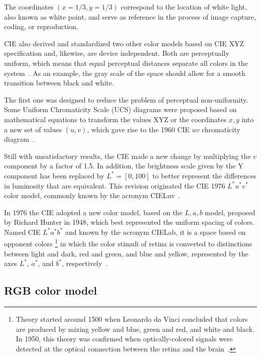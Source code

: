 The coordinates $ (x = 1/3, y = 1/3) $ correspond to the location of white light, also known as white point, and serve as reference in the process of image capture, coding, or reproduction.

CIE also derived and standardized two other color models based on CIE XYZ specification and, likewise, are device independent. Both are perceptually uniform, which means that equal perceptual distances separate all colors in the system~\citep{vezhnevets:03}. As an example, the gray scale of the space should allow for a smooth transition between black and white.

The first one was designed to reduce the problem of perceptual non-uniformity. Some Uniform Chromaticity Scale (UCS) diagrams were proposed based on mathematical equations to transform the values XYZ or the coordinates $x, y$ into a new set of values $(u, v)$, which gave rise to the 1960 CIE $uv$ chromaticity diagram~\citep{gevers:12}.

Still with unsatisfactory results, the CIE made a new change by multiplying the $v$ component by a factor of 1.5. In addition, the brightness scale given by the Y component has been replaced by $L^* = [0, 100]$ to better represent the differences in luminosity that are equivalent. This revision originated the CIE 1976 $L^*u^*v^*$ color model, commonly known by the acronym CIELuv~\citep{gevers:12}.

In 1976 the CIE adopted a new color model, based on the $L, a, b$ model, proposed by Richard Hunter in 1948, which best represented the uniform spacing of colors. Named CIE $L^*a^*b^*$ and known by the acronym CIELab, it is a space based on opponent colors \footnote{Theory started around 1500 when Leonardo da Vinci concluded that colors are produced by mixing yellow and blue, green and red, and white and black. In 1950, this theory was confirmed when optically-colored signals were detected at the optical connection between the retina and the brain~\citep{gevers:12}.} in which the color stimuli of retina is converted to distinctions between light and dark, red and green, and blue and yellow, represented by the axes $L^*$, $a^*$, and $b^*$, respectively~\citep{gevers:12}.


\subsection{RGB color model}
\label{sec:modelo_cores_rgb}

